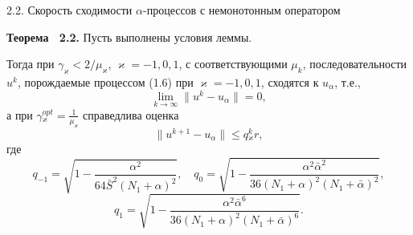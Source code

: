 \documentclass[10pt,pdf, mathserif, hyperref={unicode}]{beamer}
\begin{document}
\begin{frame}{\small 2.2. Скорость сходимости $\alpha$-процессов с немонотонным оператором}
	\begin{block}{\bf Теорема ~2.2.}
		Пусть выполнены условия леммы. 
		
		Тогда при $\gamma_\varkappa<2/\mu _\varkappa$, $\varkappa=-1,0,1$, с соответствующими $\mu _k$, последовательности ${u^k}$, порождаемые процессом (1.6) при $\varkappa=-1,0,1$, сходятся к $u_\alpha$, т.е., $$\lim_{k\to\infty}\|u^k-u_\alpha\|=0,$$ а при $
		\gamma{_\varkappa^{opt}}=\frac{1}{\mu_\varkappa}$
		справедлива оценка $$\|u^{k+1}-u_\alpha\|\leqslant q{_\varkappa^k}r,$$ где
		$$q_{-1}=\sqrt{1-\frac{\alpha^2}{64\bar S^2(N_1+\alpha)^2}}, \quad q_0=\sqrt{1-\frac{\alpha^2\bar\alpha^2}{36(N_1+\alpha)^2(N_1+\bar\alpha)^2}},$$
		$$q_1=\sqrt{1-\frac{\alpha^2\bar\alpha^6}{36(N_1+\alpha)^2(N_1+\bar\alpha)^6}}.$$
	\end{block}
\end{frame}
%		
\end{document}

